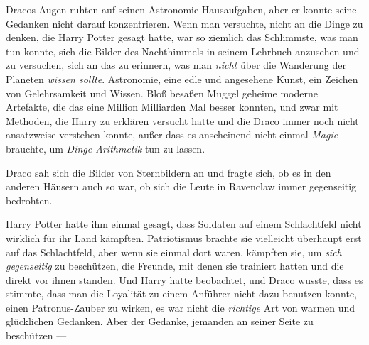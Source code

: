 Dracos Augen ruhten auf seinen Astronomie-Hausaufgaben, aber er konnte seine Gedanken nicht darauf konzentrieren. Wenn man versuchte, nicht an die Dinge zu denken, die Harry Potter gesagt hatte, war so ziemlich das Schlimmste, was man tun konnte, sich die Bilder des Nachthimmels in seinem Lehrbuch anzusehen und zu versuchen, sich an das zu erinnern, was man \emph{nicht} über die Wanderung der Planeten \emph{wissen sollte}. Astronomie, eine edle und angesehene Kunst, ein Zeichen von Gelehrsamkeit und Wissen. Bloß besaßen Muggel geheime moderne Artefakte, die das eine Million Milliarden Mal besser konnten, und zwar mit Methoden, die Harry zu erklären versucht hatte und die Draco immer noch nicht ansatzweise verstehen konnte, außer dass es anscheinend nicht einmal \emph{Magie} brauchte, um \emph{Dinge Arithmetik} tun zu lassen.

Draco sah sich die Bilder von Sternbildern an und fragte sich, ob es in den anderen Häusern auch so war, ob sich die Leute in Ravenclaw immer gegenseitig bedrohten.

Harry Potter hatte ihm einmal gesagt, dass Soldaten auf einem Schlachtfeld nicht wirklich für ihr Land kämpften. Patriotismus brachte sie vielleicht überhaupt erst auf das Schlachtfeld, aber wenn sie einmal dort waren, kämpften sie, um \emph{sich gegenseitig} zu beschützen, die Freunde, mit denen sie trainiert hatten und die direkt vor ihnen standen. Und Harry hatte beobachtet, und Draco wusste, dass es stimmte, dass man die Loyalität zu einem Anführer nicht dazu benutzen konnte, einen Patronus-Zauber zu wirken, es war nicht die \emph{richtige} Art von warmen und glücklichen Gedanken. Aber der Gedanke, jemanden an seiner Seite zu beschützen —

